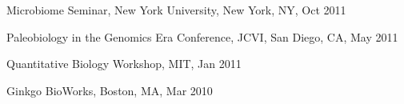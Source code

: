 \documentclass[overlapped,line,11pt]{res}
\newenvironment{list2}{
  \begin{list}{$\bullet$}{%
      \setlength{\itemsep}{0in}
      \setlength{\parsep}{0in} \setlength{\parskip}{0in}
      \setlength{\topsep}{0in} \setlength{\partopsep}{0in} 
      \setlength{\leftmargin}{0.2in}}}{\end{list}}
\begin{document}
\begin{resume}
\begin{revnumerate}[50]
\item {Microbiome Seminar,
  New York University, New York, NY, Oct 2011}

\item {Paleobiology in the Genomics Era
  Conference, JCVI, San Diego, CA, May 2011}

\item {Quantitative Biology Workshop, MIT, Jan 2011}

\item {Ginkgo BioWorks, Boston, MA, Mar 2010}

\end{revnumerate}




\end{resume}
\end{document}

